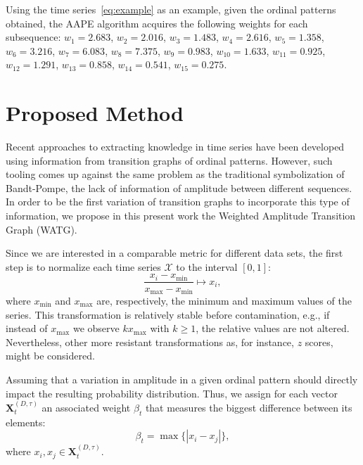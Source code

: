 Using the time series~\ref{eq:example} as an example, given the ordinal patterns obtained, the AAPE algorithm acquires the following weights for each subsequence:
$w_1 = 2.683$, 
$w_2 = 2.016$,
$w_3 = 1.483$,
$w_4 = 2.616$,
$w_5 = 1.358$,
$w_6 = 3.216$,
$w_7 = 6.083$,
$w_8 = 7.375$,
$w_9 = 0.983$,
$w_{10} = 1.633$,
$w_{11} = 0.925$,
$w_{12} = 1.291$,
$w_{13} = 0.858$,
$w_{14} = 0.541$,
$w_{15} = 0.275$.

\section{Proposed Method}\label{WATG}

Recent approaches to extracting knowledge in time series have been developed using information from transition graphs of ordinal patterns.
However, such tooling comes up against the same problem as the traditional symbolization of Bandt-Pompe, the lack of information of amplitude between different sequences.
In order to be the first variation of transition graphs to incorporate this type of information, we propose in this present work the Weighted Amplitude Transition Graph (WATG).

Since we are interested in a comparable metric for different data sets, the first step is to normalize each time series $\mathcal{X}$ to the interval $[0, 1]$:
\begin{equation}
\frac{x_i - x_{\min}}{x_{\max} - x_{\min}} \longmapsto x_i,
\label{eq:scaling}
\end{equation}
where $x_{\min}$ and $x_{\max}$ are, respectively, the minimum and maximum values of the series.
This transformation is relatively stable before contamination, e.g., if instead of $x_{\max}$ we observe $k x_{\max}$ with $k\geq 1$, the relative values are not altered. Nevertheless, other more resistant transformations as, for instance, $z$ scores, might be considered.

Assuming that a variation in amplitude in a given ordinal pattern should directly impact the resulting probability distribution.
Thus, we assign for each vector $\mathbf{X}^{(D, \tau)}_t$ an associated weight $\beta_t$ that measures the biggest difference between its elements:
\begin{equation}
\beta_t = \max\{|x_i - x_j|\},
\end{equation}
where $x_i, x_j \in \mathbf{X}^{(D, \tau)}_t$.

